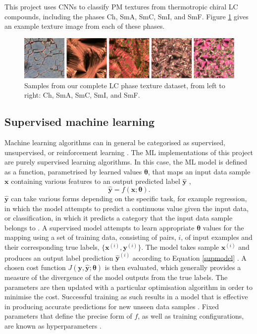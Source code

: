 \documentclass[12pt]{article}
\begin{document}
This project uses CNNs to classify PM textures from thermotropic chiral LC compounds, including the phases Ch, SmA, SmC, SmI, and SmF. Figure \ref{textures} gives an example texture image from each of these phases.
\begin{figure}[!h]
\centering
\includegraphics[width=\textwidth]{images/textures.png}
\caption{Samples from our complete LC phase texture dataset, from left to right: Ch, SmA, SmC, SmI, and SmF.}
\label{textures}
\end{figure}  

\subsection{Supervised machine learning}
Machine learning algorithms can in general be categorised as supervised, unsupervised, or reinforcement learning \cite{Murphy12}. The ML implementations of this project are purely supervised learning algorithms. In this case, the ML model is defined as a function, parametrised by learned values $\bm{\theta}$, that maps an input data sample $\bm{x}$ containing various features to an output predicted label $\hat{\bm{y}}$ \cite{Murphy12},
\begin{equation}
\hat{\bm{y}}=f(\bm{x};\bm{\theta}). \label{supmodel} 
\end{equation}
$\hat{\bm{y}}$ can take various forms depending on the specific task, for example regression, in which the model attempts to predict a continuous value given the input data, or classification, in which it predicts a category that the input data sample belongs to \cite{Murphy12}. A supervised model attempts to learn appropriate $\bm{\theta}$ values for the mapping using a set of training data, consisting of pairs, $i$, of input examples and their corresponding true labels, $\lbrace\bm{x}^{(i)},\bm{y}^{(i)}\rbrace$. The model takes sample $\bm{x}^{(i)}$ and produces an output label prediction $\hat{\bm{y}}^{(i)}$ according to Equation \ref{supmodel} \cite{Murphy12}. A chosen cost function $J(\bm{y},\hat{\bm{y}};\bm{\theta})$ is then evaluated, which generally provides a measure of the divergence of the model outputs from the true labels. The parameters are then updated with a particular optimisation algorithm in order to minimise the cost. Successful training as such results in a model that is effective in producing accurate predictions for new unseen data samples \cite{Murphy12, Goodfellow16}. Fixed parameters that define the precise form of $f$, as well as training configurations, are known as hyperparameters \cite{Murphy12, Goodfellow16}.
\end{document}
